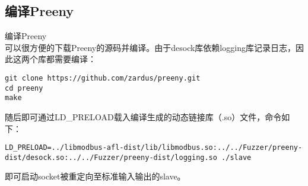 \documentclass[algorithm, pgfplots]{styles/cuzbeamer_objnf}
\newcommand{\yasong}{\CJKfamily{yasong}}
\begin{document}
    \begin{fragile}
        \subsection{编译Preeny}
        \begin{block}{\yasong 编译Preeny}
            \ \\
            可以很方便的下载Preeny的源码并编译。由于desock库依赖logging库记录日志，因此这两个库都需要编译：
            \begin{verbatim}
git clone https://github.com/zardus/preeny.git
cd preeny
make
            \end{verbatim}
            随后即可通过LD\_PRELOAD载入编译生成的动态链接库（.so）文件，命令如下：
            \begin{verbatim}
LD_PRELOAD=../libmodbus-afl-dist/lib/libmodbus.so:../../Fuzzer/preeny-dist/desock.so:../../Fuzzer/preeny-dist/logging.so ./slave
            \end{verbatim}
            即可启动socket被重定向至标准输入输出的slave。
        \end{block}
    \end{fragile}
\end{document}
